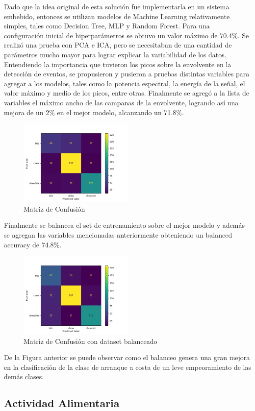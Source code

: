\documentclass[11pt]{charter}
\begin{document}
Dado que la idea original de esta solución fue implementarla en un sistema embebido, entonces se utilizan modelos de Machine Learning relativamente simples, tales como Decision Tree, MLP y Random Forest. Para una configuración inicial de hiperparámetros se obtuvo un valor máximo de 70.4\%. Se realizó una prueba con PCA e ICA, pero se necesitaban de una cantidad de parámetros mucho mayor para lograr explicar la variabilidad de los datos.
Entendiendo la importancia que tuvieron los picos sobre la envolvente en la detección de eventos, se propusieron y pusieron a pruebas distintas variables para agregar a los modelos, tales como la potencia espectral, la energía de la señal, el valor máximo y medio de los picos, entre otras. Finalmente se agregó a la lista de variables el máximo ancho de las campanas de la envolvente, logrando así una mejora de un 2\% en el mejor modelo, alcanzando un 71.8\%.
\begin{figure}[H]
	\centering 
	\includegraphics[width=0.5\textwidth, scale=0.5]{./Figuras/modelfirst.png}
	\caption{Matriz de Confusión}
	\label{fig:first}
\end{figure}
Finalmente se balancea el set de entrenamiento sobre el mejor modelo y además se agregan las variables mencionadas anteriormente obteniendo un balanced accuracy de 74.8\%. 
\begin{figure}[H]
	\centering 
	\includegraphics[width=0.5\textwidth, scale=0.5]{./Figuras/modelimbsecond.png}
	\caption{Matriz de Confusión con dataset balanceado}
	\label{fig:second}
\end{figure}
De la Figura anterior se puede observar como el balanceo genera una gran mejora en la clasificación de la clase de arranque a costa de un leve empeoramiento de las demás clases.
 
\subsection{Actividad Alimentaria}

	
\end{document}
